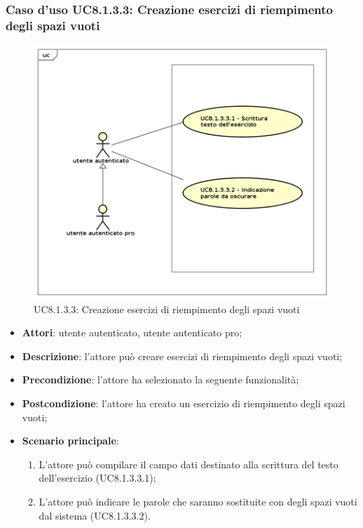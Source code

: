 \subsubsection{Caso d'uso UC8.1.3.3: Creazione esercizi di riempimento degli spazi vuoti}
	\label{UC8.1.3.3}
	\begin{figure}[h]
		\centering
			\includegraphics[scale=0.45,keepaspectratio]{UML/UC8_1_3_3.png}
		\caption{UC8.1.3.3: Creazione esercizi di riempimento degli spazi vuoti}
	\end{figure}
	\FloatBarrier
	\begin{itemize}
		\item
			\textbf{Attori}: utente autenticato, utente autenticato pro;
		\item		
			\textbf{Descrizione}: l'attore può creare esercizi di riempimento degli spazi vuoti;
		\item
			\textbf{Precondizione}: l'attore ha selezionato la seguente funzionalità; 
		\item
			\textbf{Postcondizione}: l'attore ha creato un esercizio di riempimento degli spazi vuoti;
		\item
			\textbf{Scenario principale}:
	       		\begin{enumerate}
	       			\item
	       			L'attore può compilare il campo dati destinato alla scrittura del testo dell'esercizio (UC8.1.3.3.1);
	       			\item
	       			L'attore può indicare le parole che saranno sostituite con degli spazi vuoti dal sistema (UC8.1.3.3.2).
	 			\end{enumerate}
	\end{itemize}
	
